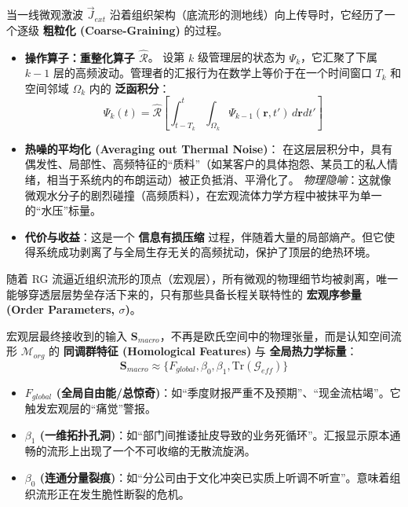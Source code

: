 
当一线微观激波 $\vec{J}_{ext}$ 沿着组织架构（底流形的测地线）向上传导时，它经历了一个逐级 \textbf{粗粒化 (Coarse-Graining)} 的过程。

\begin{itemize}
    \item \textbf{操作算子：重整化算子 $\hat{\mathcal{R}}$}。
    设第 $k$ 级管理层的状态为 $\Psi_k$，它汇聚了下属 $k-1$ 层的高频波动。管理者的汇报行为在数学上等价于在一个时间窗口 $T_k$ 和空间邻域 $\Omega_k$ 内的 \textbf{泛函积分}：
    $$ \Psi_k(t) = \hat{\mathcal{R}} \left[ \int_{t-T_k}^{t} \int_{\Omega_k} \Psi_{k-1}(\mathbf{r}, t') \, d\mathbf{r} dt' \right] $$

    \item \textbf{热噪的平均化 (Averaging out Thermal Noise)}：
    在这层层积分中，具有偶发性、局部性、高频特征的“质料”（如某客户的具体抱怨、某员工的私人情绪，相当于系统内的布朗运动）被正负抵消、平滑化了。
    \textit{物理隐喻}：这就像微观水分子的剧烈碰撞（高频质料），在宏观流体力学方程中被抹平为单一的“水压”标量。

    \item \textbf{代价与收益}：这是一个 \textbf{信息有损压缩} 过程，伴随着大量的局部熵产。但它使得系统成功剥离了与全局生存无关的高频扰动，保护了顶层的绝热环境。
\end{itemize}


随着 RG 流逼近组织流形的顶点（宏观层），所有微观的物理细节均被剥离，唯一能够穿透层层势垒存活下来的，只有那些具备长程关联特性的 \textbf{宏观序参量 (Order Parameters, $\sigma$)}。

\begin{theorem}[组织拓扑提取定理]
    宏观层最终接收到的输入 $\mathbf{S}_{macro}$，不再是欧氏空间中的物理张量，而是认知空间流形 $\mathcal{M}_{org}$ 的 \textbf{同调群特征 (Homological Features)} 与 \textbf{全局热力学标量}：
    $$ \mathbf{S}_{macro} \approx \{ F_{global}, \beta_0, \beta_1, \text{Tr}(\mathcal{G}_{eff}) \} $$
\end{theorem}

\begin{itemize}
    \item \textbf{$F_{global}$ (全局自由能/总惊奇)}：如“季度财报严重不及预期”、“现金流枯竭”。它触发宏观层的“痛觉”警报。
    \item \textbf{$\beta_1$ (一维拓扑孔洞)}：如“部门间推诿扯皮导致的业务死循环”。汇报显示原本通畅的流形上出现了一个不可收缩的无散流旋涡。
    \item \textbf{$\beta_0$ (连通分量裂痕)}：如“分公司由于文化冲突已实质上听调不听宣”。意味着组织流形正在发生脆性断裂的危机。
\end{itemize}

